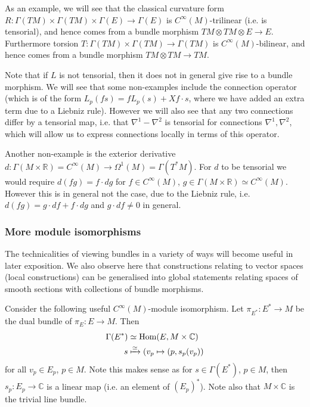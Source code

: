 \documentclass[a4paper]{article}
\theoremstyle{definition} \newtheorem*{definition}{Definition}
\theoremstyle{definition} \newtheorem*{definitions}{Definitions}
\theoremstyle{plain} \newtheorem{theorem}{Theorem}[section]
\theoremstyle{plain} \newtheorem{proposition}[theorem]{Proposition}
\theoremstyle{plain} \newtheorem{corollary}[theorem]{Corollary}
\theoremstyle{plain} \newtheorem{lemma}[theorem]{Lemma}
\theoremstyle{plain} \newtheorem{example}[theorem]{Example}
\newcommand{\realnos}{\mathbb{R}}
\newcommand{\complexnos}{\mathbb{C}}
\newcommand{\smooth}{C^\infty}
\begin{document}
As an example, we will see that the classical curvature form $R:\Gamma(TM)\times \Gamma(TM) \times \Gamma(E)\to \Gamma(E)$ is $\smooth(M)$-trilinear (i.e. is tensorial), and hence comes from a bundle morphism $TM\otimes TM\otimes E\to E$. Furthermore torsion $T:\Gamma(TM)\times \Gamma(TM)\to \Gamma(TM)$ is $\smooth (M)$-bilinear, and hence comes from a bundle morphism $TM\otimes TM\to TM$.

Note that if $L$ is not tensorial, then it does not in general give rise to a bundle morphism. We will see that some non-examples include the connection operator (which is of the form $L_p(fs)=fL_p(s)+X f\cdot s$, where we have added an extra term due to a Liebniz rule). However we will also see that any two connections differ by a tensorial map, i.e. that $\nabla^1-\nabla^2$ is tensorial for connections $\nabla^1, \nabla^2$, which will allow us to express connections locally in terms of this operator. 

Another non-example is the exterior derivative $d:\Gamma(M\times \realnos)=\smooth(M)\to \Omega^1(M)=\Gamma(T^*M)$. For $d$ to be tensorial we would require $d(fg)=f\cdot dg$ for $f\in \smooth(M)$, $g\in \Gamma(M\times \realnos)\simeq \smooth(M)$. However this is in general not the case, due to the Liebniz rule, i.e. $d(fg)=g\cdot df + f\cdot dg$ and $g\cdot df\neq 0$ in general. 


\subsubsection{More module isomorphisms}
The technicalities of viewing bundles in a variety of ways will become useful in later exposition. We also observe here that constructions relating to vector spaces (local constructions) can be generalised into global statements relating spaces of smooth sections with collections of bundle morphisms.

Consider the following useful $C^\infty(M)$-module isomorphism. Let $\pi_{E^\ast}:E^\ast \to M$ be the dual bundle of $\pi_E:E \to M$. Then 
\begin{align*}
\Gamma(E^\ast) & \simeq \text{Hom}(E, M\times \complexnos) \\
s & \xmapsto{\simeq} (v_p\mapsto (p, s_p(v_p))
\end{align*}
for all $v_p\in E_p$, $p\in M$. Note this makes sense as for $s\in \Gamma(E^*)$, $p\in M$, then $s_p:E_p\to \complexnos$ is a linear map (i.e. an element of $(E_p)^*$).
Note also that $M\times \complexnos$ is the trivial line bundle. 
\end{document}

